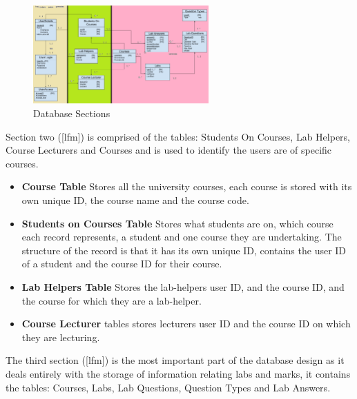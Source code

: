 \documentclass[11pt]{report}
\begin{document}
\begin{figure}[H]
    \centering
    \includegraphics[width=0.6\textwidth]{images/design/DB_Sections.png}
    \caption{Database Sections}
    \label{fig:dbsections}
\end{figure}


\noindent Section two ([lfm]) is comprised of the tables: Students On Courses, Lab Helpers, Course Lecturers and Courses and is used to identify the  users are of specific courses.
\begin{itemize}
    \item \textbf{Course Table} Stores all the university courses, each course is stored with its own unique ID, the course name and the course code.
    \item \textbf{Students on Courses Table} Stores what students are on, which course each record represents, a student and one course they are undertaking. The structure of the record is that it has its own unique ID, contains the user ID of a student and the course ID for their course. 
    \item \textbf{Lab Helpers Table} Stores the lab-helpers user ID, and the course ID, and the course for which they are a lab-helper.
    \item \textbf{Course Lecturer} tables stores lecturers user ID and the course ID on which they are lecturing.
\end{itemize}



The third section ([lfm]) is the most important part of the database design as it deals entirely with the storage of information relating labs and marks, it contains the tables: Courses, Labs, Lab Questions, Question Types and Lab Answers.
\end{document}
